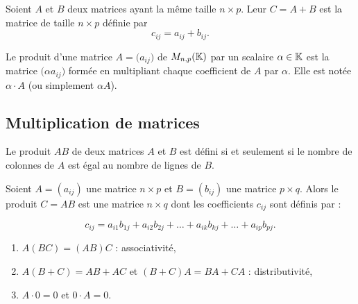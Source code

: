 \documentclass[10pt,class=article,crop=false]{standalone}
\begin{document}
\begin{multicols}{2}
\begin{itemize}
\end{itemize}



\begin{definition}
	Soient $A$ et $B$ deux matrices ayant la même taille $n\times p$.
	Leur  $C=A+B$ est la matrice de taille $n\times p$ définie par
	\[c_{ij}=a_{ij}+b_{ij}.\]
\end{definition}



\begin{definition}
	Le produit d'une matrice $A=\big(a_{ij}\big)$ de $M_{n,p}(\mathbb{K})$
	par un scalaire $\alpha \in \mathbb{K}$ est la matrice
	$\big(\alpha a_{ij}\big)$ formée en
	multipliant chaque coefficient de $A$ par $\alpha$. Elle est notée $\alpha \cdot A$ (ou simplement $\alpha A$).
\end{definition}


\subsection{Multiplication de matrices}


Le produit $AB$ de deux matrices $A$ et $B$ est défini si et seulement si le nombre de colonnes de
$A$ est égal au nombre de lignes de $B$.

\begin{definition}
	Soient $A=(a_{ij})$ une matrice $n\times p$ et $B=(b_{ij})$ une matrice $p\times q$.
	Alors le produit $C=AB$ est une matrice $n\times q$ dont les coefficients $c_{ij}$
	sont définis par :
	
\end{definition}

$$c_{ij}=a_{i1}b_{1j}+a_{i2}b_{2j}+ \dots +
a_{ik}b_{kj}+ \dots + a_{ip}b_{pj}.$$



\begin{proposition}
	\sauteligne
	\begin{enumerate}
		\item $A (BC) = (AB) C$ : associativité,
		
		\item $A(B+C) = AB + AC$ \quad et \quad  $(B+C) A = BA + CA$ : distributivité,
		
		\item $A\cdot 0 = 0$ \quad et \quad $0\cdot A= 0$.
	\end{enumerate}
\end{proposition}


\end{multicols}
\end{document}
